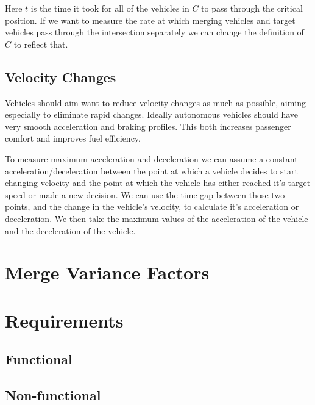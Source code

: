 Here $t$ is the time it took for all of the vehicles in $C$ to pass through the critical position. If we want to measure the rate at which merging vehicles and target vehicles pass through the intersection separately we can change the definition of $C$ to reflect that.

\subsection{Velocity Changes}
\label{subsec:Velocity Changes}
Vehicles should aim want to reduce velocity changes as much as possible, aiming especially to eliminate rapid changes. Ideally autonomous vehicles should have very smooth acceleration and braking profiles. This both increases passenger comfort and improves fuel efficiency.

To measure maximum acceleration and deceleration we can assume a constant acceleration/deceleration between the point at which a vehicle decides to start changing velocity and the point at which the vehicle has either reached it's target speed or made a new decision. We can use the time gap between those two points, and the change in the vehicle's velocity, to calculate it's acceleration or deceleration. We then take the maximum values of the acceleration of the vehicle and the deceleration of the vehicle.

\section{Merge Variance Factors}
\label{sec:Merge Variance Factors}


\section{Requirements}
\label{sec:Requirements}

\subsection{Functional}
\label{subsec:Functional}

\subsection{Non-functional}
\label{subsec:Non-functional}